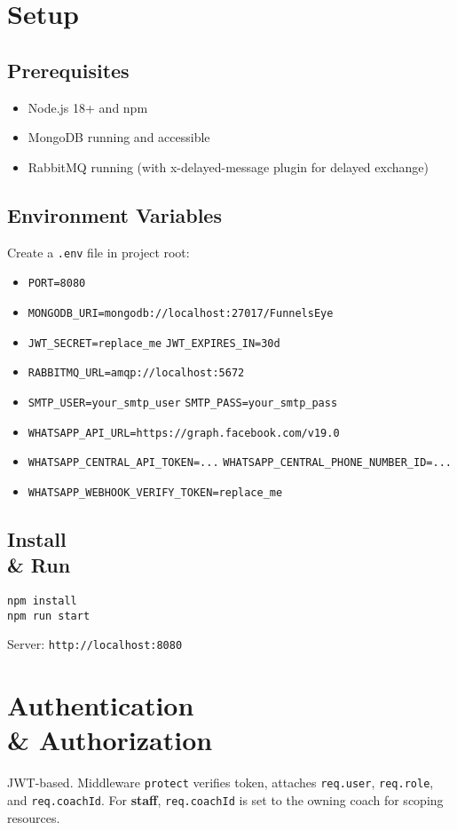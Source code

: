 \documentclass[11pt,a4paper]{article}
\begin{document}
\section{Setup}
\subsection{Prerequisites}
\begin{itemize}[noitemsep]
  \item Node.js 18+ and npm
  \item MongoDB running and accessible
  \item RabbitMQ running (with x-delayed-message plugin for delayed exchange)
\end{itemize}

\subsection{Environment Variables}
Create a \texttt{.env} file in project root:
\begin{itemize}[noitemsep]
  \item \texttt{PORT=8080}
  \item \texttt{MONGODB\_URI=mongodb://localhost:27017/FunnelsEye}
  \item \texttt{JWT\_SECRET=replace\_me}\; \texttt{JWT\_EXPIRES\_IN=30d}
  \item \texttt{RABBITMQ\_URL=amqp://localhost:5672}
  \item \texttt{SMTP\_USER=your\_smtp\_user}\; \texttt{SMTP\_PASS=your\_smtp\_pass}
  \item \texttt{WHATSAPP\_API\_URL=https://graph.facebook.com/v19.0}
  \item \texttt{WHATSAPP\_CENTRAL\_API\_TOKEN=...}\; \texttt{WHATSAPP\_CENTRAL\_PHONE\_NUMBER\_ID=...}
  \item \texttt{WHATSAPP\_WEBHOOK\_VERIFY\_TOKEN=replace\_me}
\end{itemize}

\subsection{Install \\& Run}
\begin{verbatim}
npm install
npm run start
\end{verbatim}
Server: \texttt{http://localhost:8080}

\section{Authentication \\& Authorization}
JWT-based. Middleware \texttt{protect} verifies token, attaches \texttt{req.user}, \texttt{req.role}, and \texttt{req.coachId}. For \textbf{staff}, \texttt{req.coachId} is set to the owning coach for scoping resources.
\end{document}
